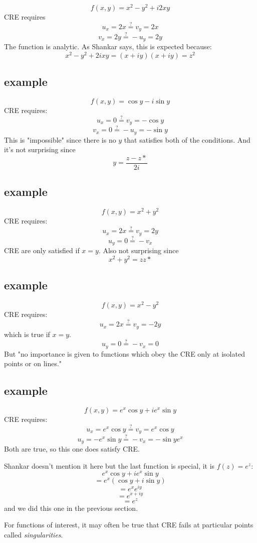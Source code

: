 \documentclass[11pt, oneside]{article}
\begin{document}
\[ f(x,y) = x^2 - y^2 + i2xy \]
CRE requires
\[ u_x = 2x \stackrel{?}{=}  v_y = 2x \]
\[ v_x = 2y \stackrel{?}{=} - u_y = 2y \]
The function is analytic.  As Shankar says, this is expected because:
\[ x^2 - y^2 + 2ixy = (x + iy)(x + iy) = z^2 \]

\subsection*{example}

\[ f(x,y) = \cos y - i \sin y \]
CRE requires:
\[ u_x = 0 \stackrel{?}{=} v_y = - \cos y \]
\[ v_x = 0 \stackrel{?}{=}  -u_y = - \sin y \]
This is "impossible" since there is no $y$ that satisfies both of the conditions.  And it's not surprising since
\[ y = \frac{z - z*}{2i} \]

\subsection*{example}

\[ f(x,y) = x^2 + y^2 \]
CRE requires:
\[ u_x = 2x \stackrel{?}{=}  v_y = 2y \]
\[ u_y = 0 \stackrel{?}{=}  -v_x \]
CRE are only satisfied if $x=y$.  Also not surprising since
\[ x^2 + y^2 = zz* \]

\subsection*{example}

\[ f(x,y) = x^2 - y^2 \]
CRE requires:
\[ u_x = 2x \stackrel{?}{=} v_y = -2y \]
which is true if $x = y$.
\[ u_y = 0 \stackrel{?}{=} -v_x = 0 \]
But "no importance is given to functions which obey the CRE only at isolated points or on lines."

\subsection*{example}

\[ f(x,y) = e^x \cos y + i e^x \sin y \]
CRE requires:
\[ u_x = e^x \cos y \stackrel{?}{=} v_y = e^x \cos y \]
\[ u_y = -e^x \sin y \stackrel{?}{=} -v_x = - \sin y e^x \]
Both are true, so this one does satisfy CRE.

Shankar doesn't mention it here but the last function is special, it is $f(z) = e^z$:
\[ e^x \cos y + i e^x \sin y \]
\[ = e^x (\cos y + i \sin y) \]
\[ = e^x e^{iy} \]
\[ = e^{x + iy} \]
\[ = e^z \]
and we did this one in the previous section.

For functions of interest, it may often be true that CRE fails at particular points called \emph{singularities}.
\end{document}
